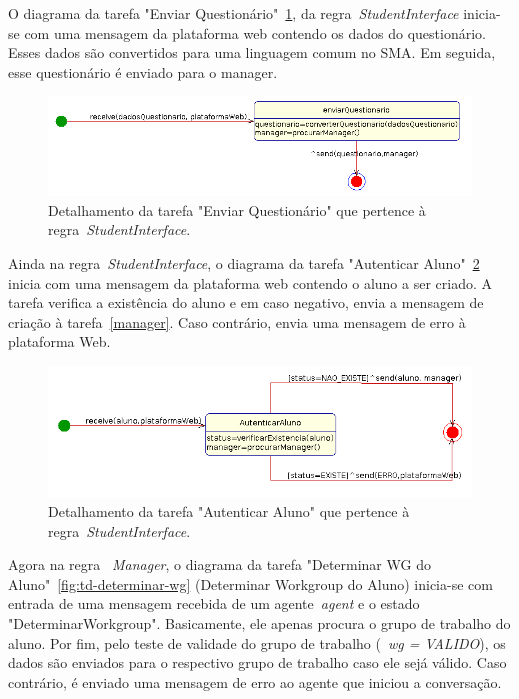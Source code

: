 O diagrama da tarefa "Enviar Questionário"~\ref{fig:td-enviar-quest}, da regra~\emph{StudentInterface} inicia-se com uma mensagem da plataforma web contendo os dados do questionário. Esses dados são convertidos para uma linguagem comum no SMA. Em seguida, esse questionário é enviado para o manager.

\begin{figure}
	\centering
	\includegraphics[scale=0.48]{images/td-enviar-quest.png}
	\caption{Detalhamento da tarefa "Enviar Questionário" que pertence à regra~\emph{StudentInterface}.}
	\label{fig:td-enviar-quest}
\end{figure}

Ainda na regra~\emph{StudentInterface}, o diagrama da tarefa "Autenticar Aluno"~\ref{fig:td-autenticar-aluno} inicia com uma mensagem da plataforma web contendo o aluno a ser criado. A tarefa verifica a existência do aluno e em caso negativo, envia a mensagem de criação à tarefa~\ref{manager}. Caso contrário, envia uma mensagem de erro à plataforma Web.

\begin{figure}
	\centering
	\includegraphics[scale=0.48]{images/td-autenticar-aluno.png}
	\caption{Detalhamento da tarefa "Autenticar Aluno" que pertence à regra~\emph{StudentInterface}.}
	\label{fig:td-autenticar-aluno}
\end{figure}

Agora na regra ~\emph{Manager}, o diagrama da tarefa "Determinar WG do Aluno"~\ref{fig:td-determinar-wg} (Determinar Workgroup do Aluno) inicia-se com entrada de uma mensagem recebida de um agente~\emph{agent} e o estado "DeterminarWorkgroup". Basicamente, ele apenas procura o grupo de trabalho do aluno. Por fim, pelo teste de validade do grupo de trabalho (~\emph{wg = VALIDO}), os dados são enviados para o respectivo grupo de trabalho caso ele sejá válido. Caso contrário, é enviado uma mensagem de erro ao agente que iniciou a conversação.

